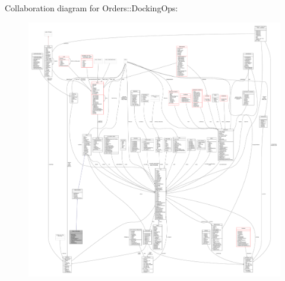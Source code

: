 Collaboration diagram for Orders\+:\+:Docking\+Ops\+:
\nopagebreak
\begin{figure}[H]
\begin{center}
\leavevmode
\includegraphics[width=350pt]{db/d54/classOrders_1_1DockingOps__coll__graph}
\end{center}
\end{figure}
